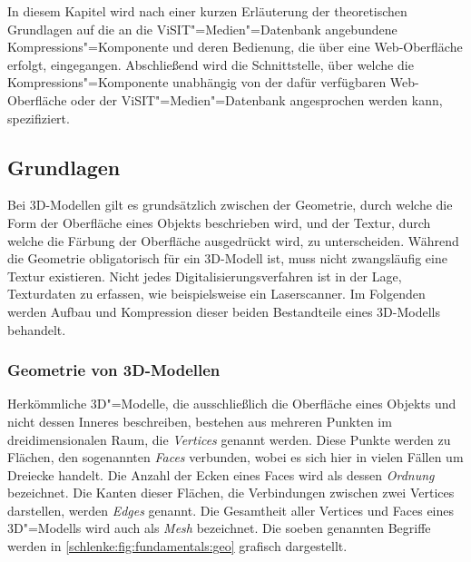 In diesem Kapitel wird nach einer kurzen Erläuterung der theoretischen Grundlagen auf die an die ViSIT"=Medien"=Datenbank angebundene Kompressions"=Komponente und deren Bedienung, die über eine Web-Oberfläche erfolgt, eingegangen. Abschließend wird die Schnittstelle, über welche die Kompressions"=Komponente unabhängig von der dafür verfügbaren Web-Oberfläche oder der ViSIT"=Medien"=Datenbank angesprochen werden kann, spezifiziert.

\subsection{Grundlagen}

Bei 3D-Modellen gilt es grundsätzlich zwischen der Geometrie, durch welche die Form der Oberfläche eines Objekts beschrieben wird, und der Textur, durch welche die Färbung der Oberfläche ausgedrückt wird, zu unterscheiden. Während die Geometrie obligatorisch für ein 3D-Modell ist, muss nicht zwangsläufig eine Textur existieren. Nicht jedes Digitalisierungsverfahren ist in der Lage, Texturdaten zu erfassen, wie beispielsweise ein Laserscanner. Im Folgenden werden Aufbau und Kompression dieser beiden Bestandteile eines 3D-Modells behandelt.

\subsubsection{Geometrie von 3D-Modellen}
\label{schlenke:chp:fundamentalsGeometry}

Herkömmliche 3D"=Modelle, die ausschließlich die Oberfläche eines Objekts und nicht dessen Inneres beschreiben, bestehen aus mehreren Punkten im dreidimensionalen Raum, die \emph{Vertices} genannt werden. Diese Punkte werden zu Flächen, den sogenannten \emph{Faces} verbunden, wobei es sich hier in vielen Fällen um Dreiecke handelt. Die Anzahl der Ecken eines Faces wird als dessen \emph{Ordnung} bezeichnet. Die Kanten dieser Flächen, die Verbindungen zwischen zwei Vertices darstellen, werden \emph{Edges} genannt. Die Gesamtheit aller Vertices und Faces eines 3D"=Modells wird auch als \emph{Mesh} bezeichnet. Die soeben genannten Begriffe werden in \autoref{schlenke:fig:fundamentals:geo} grafisch dargestellt.

